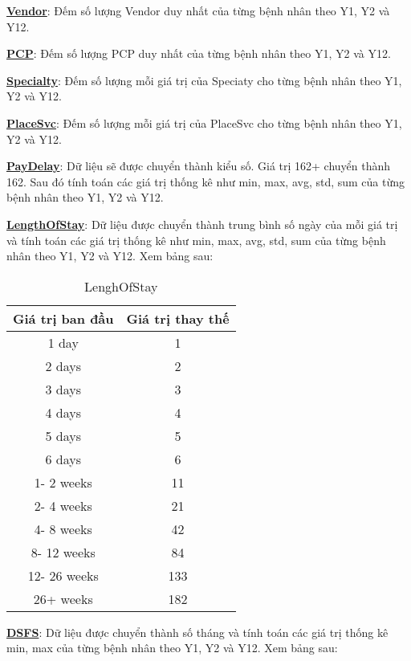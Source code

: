 \textbf{\underline{Vendor}}: Đếm số lượng Vendor duy nhất của từng bệnh nhân theo Y1, Y2 và Y12.

\textbf{\underline{PCP}}: Đếm số lượng PCP duy nhất của từng bệnh nhân theo Y1, Y2 và Y12.

\textbf{\underline{Specialty}}: Đếm số lượng mỗi giá trị của Speciaty cho từng bệnh nhân theo Y1, Y2 và Y12.

\textbf{\underline{PlaceSvc}}: Đếm số lượng mỗi giá trị của PlaceSvc cho từng bệnh nhân theo Y1, Y2 và Y12.

\textbf{\underline{PayDelay}}: Dữ liệu sẽ được chuyển thành kiểu số. Giá trị 162+ chuyển thành 162. Sau đó tính toán các giá trị thống kê như min, max, avg, std, sum của từng bệnh nhân theo Y1, Y2 và Y12.

\textbf{\underline{LengthOfStay}}: Dữ liệu được chuyển thành trung bình số ngày của mỗi giá trị và tính toán các giá trị thống kê như min, max, avg, std, sum của từng bệnh nhân theo Y1, Y2 và Y12. Xem bảng sau:

\begin{table}[h!]
    \centering
    \begin{tabular}{||c c||} 
     \hline
     Giá trị ban đầu & Giá trị thay thế \\
     \hline\hline
     1 day & 1 \\
     2 days & 2 \\
     3 days & 3 \\
     4 days & 4 \\
     5 days & 5 \\
     6 days & 6 \\
     1- 2 weeks & 11 \\
     2- 4 weeks & 21 \\
     4- 8 weeks & 42 \\
     8- 12 weeks & 84 \\
     12- 26 weeks & 133 \\
     26+ weeks & 182 \\
     \hline
    \end{tabular}
    \caption{LenghOfStay}
    \label{table:1}
\end{table}

\textbf{\underline{DSFS}}: Dữ liệu được chuyển thành số tháng và tính toán các giá trị thống kê min, max của từng bệnh nhân theo Y1, Y2 và Y12. Xem bảng sau:

